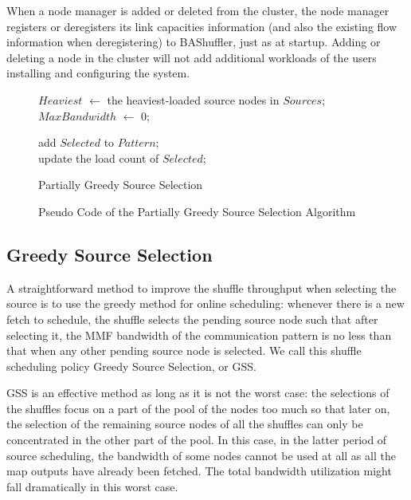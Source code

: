 \documentclass[10pt,journal,compsoc]{IEEEtran}
\makeatletter
\newcommand{\removelatexerror}{\let\@latex@error\@gobble}
\makeatother
\begin{document}
When a node manager is added or deleted from the cluster, 
the node manager registers or deregisters its link capacities information 
(and also the existing flow information when deregistering) to BAShuffler, 
just as at startup. 
Adding or deleting a node in the cluster will not add additional workloads 
of the users installing and configuring the system. 


\begin{figure}[!t]
\removelatexerror
\begin{algorithm}[H]


 $Heaviest$ $\gets$ the heaviest-loaded source nodes in $Sources$;\\
 $MaxBandwidth$ $\gets$ 0;
 
add $Selected$ to $Pattern$;\\
update the load count of $Selected$;
\caption{Partially Greedy Source Selection}
\label{algo:PGSS}
\end{algorithm}
\caption{Pseudo Code of the Partially Greedy Source Selection Algorithm}
\label{fig:PGSS}
\end{figure}



\subsection{Greedy Source Selection}
A straightforward method to improve the shuffle throughput when
selecting the source is
to use the greedy method for online scheduling: 
whenever there is a new fetch to schedule, the shuffle selects the
pending source node such that after selecting it,
the MMF bandwidth of the communication pattern is no less
than that
when any other pending source node is selected. We call this shuffle
scheduling policy Greedy Source Selection, or GSS.


GSS is an effective method as long as it is not the
worst case:
the selections of the shuffles focus on a part of the pool of the
nodes too much
so that later on, the selection of the remaining source nodes of all
the shuffles can only be concentrated in the other part of the pool.
In this case, in the latter period of source scheduling,
the bandwidth of some nodes cannot be used at all as all the map
outputs have already been fetched.
The total bandwidth utilization might fall dramatically in this worst case. 
\end{document}
